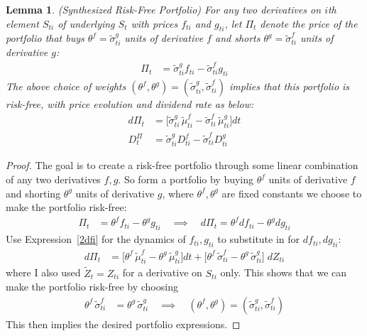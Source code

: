 \documentclass[12pt]{article}
\theoremstyle{plain}
\newtheorem{lem}[thm]{Lemma}
\theoremstyle{definition}
\theoremstyle{remark}
\begin{document}
\begin{lem}\emph{(Synthesized Risk-Free Portfolio)}
\label{2synthport}
For any two derivatives on $i$th element $S_{ti}$ of underlying $S_t$
with prices $f_{ti}$ and $g_{ti}$, let $\Pi_t$ denote the price of the
portfolio that buys $\theta^f=\tilde{\sigma}_{ti}^g$ units of derivative
$f$ and shorts $\theta^g=\tilde{\sigma}_{ti}^f$ units of derivative $g$:
\begin{align*}
  \Pi_t
  &=
  \tilde{\sigma}_{ti}^g
  f_{ti}
  -
  \tilde{\sigma}_{ti}^f
  g_{ti}
\end{align*}
The above choice of weights
$(\theta^f,\theta^g)=(\tilde{\sigma}_{ti}^g,\tilde{\sigma}_{ti}^f)$
implies that this portfolio is risk-free, with price evolution and
dividend rate as below:
\begin{align}
  d\Pi_t
  &=
  \big[
  \tilde{\sigma}_{ti}^g\,\tilde{\mu}_{ti}^f
  -
  \tilde{\sigma}_{ti}^f\,\tilde{\mu}_{ti}^g
  \big]
  dt
  \label{2portevol}
  \\
  D_t^\Pi
  &=
  \tilde{\sigma}_{ti}^g
  D_{ti}^f
  -
  \tilde{\sigma}_{ti}^f
  D_{ti}^g
\end{align}
\end{lem}
\begin{proof}
The goal is to create a risk-free portfolio through some linear
combination of any two derivatives $f,g$.
So form a portfolio by buying $\theta^f$ units of derivative $f$
and shorting $\theta^g$ units of derivative $g$, where
$\theta^f,\theta^g$ are fixed constants we choose to make the
portfolio risk-free:
\begin{align*}
  \Pi_t
  &= \theta^f f_{ti} - \theta^g g_{ti}
  \quad\implies\quad
  d\Pi_t
  = \theta^f df_{ti} - \theta^g dg_{ti}
\end{align*}
Use Expression~\ref{2dfi} for the dynamics of $f_{ti},g_{ti}$ to
substitute in for $df_{ti},dg_{ti}$:
\begin{align*}
  d\Pi_t
  &=
  \big[
  \theta^f\,\tilde{\mu}_{ti}^f
  -
  \theta^g\,\tilde{\mu}_{ti}^g
  \big]
  dt
  +
  \big[
  \theta^f\,\tilde{\sigma}_{ti}^f
  -
  \theta^g\,\tilde{\sigma}_{ti}^g
  \big]
  \;dZ_{ti}
\end{align*}
where I also used $\tilde{Z}_t=Z_{ti}$ for a derivative on $S_{ti}$
only.
This shows that we can make the portfolio risk-free by choosing
\begin{align*}
  \theta^f\,\tilde{\sigma}_{ti}^f
  &=
  \theta^g\,\tilde{\sigma}_{ti}^g
  \quad\implies\quad
  (\theta^f,\theta^g)
  =(\tilde{\sigma}_{ti}^g,\tilde{\sigma}_{ti}^f)
\end{align*}
This then implies the desired portfolio expressions.
\end{proof}
\end{document}
